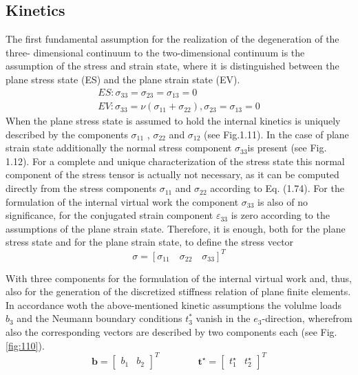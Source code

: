 \subsection{Kinetics}
The first fundamental assumption for the realization of the degeneration of the three- dimensional continuum to the two-dimensional continuum is the assumption of the stress and strain
state, where it is distinguished between the plane stress state (ES) and the plane strain state
(EV).
\begin{equation}
\label{eqn:3.2}
    \begin{gathered}
ES:{\sigma _{33}} = {\sigma _{23}} = {\sigma _{13}} = 0\\
EV:{\sigma _{33}} = \nu \left( {{\sigma _{11}} + {\sigma _{22}}} \right),{\sigma _{23}} = {\sigma _{13}} = 0
\end{gathered}
\end{equation}
When the plane stress state is assumed to hold the internal kinetics is uniquely described by
the components $\sigma_{11}$ , $\sigma_{22}$ and $\sigma_{12}$ (see Fig.1.11). In the case of plane strain state additionally
the normal stress component $\sigma_{33}$is present (see Fig. 1.12). For a complete and unique
characterization of the stress state this normal component of the stress tensor is actually not
necessary, as it can be computed directly from the stress components $\sigma_{11}$ and $\sigma_{22}$ according to
Eq. (1.74). For the formulation of the internal virtual work the component $\sigma_{33}$ is also of no
significance, for the conjugated strain component $\varepsilon_{33}$ is zero according to the assumptions of
the plane strain state. Therefore, it is enough, both for the plane stress state and for the plane
strain state, to define the stress vector
\begin{equation}
\label{eqn:3.3}
    \sigma=[\sigma_{11} \quad \sigma_{22} \quad \sigma_{33}]^T
\end{equation}

With three components for the formulation of the internal virtual work and, thus, also for the
generation of the discretized stiffness relation of plane finite elements. In accordance woth
the above-mentioned kinetic assumptions the volulme loads $b_3$ and the Neumann boundary
conditions $t^{*}_3$ vanish in the $e_3$-direction, wherefrom also the corresponding vectors are described
by two components each (see Fig. \ref{fig:110}).
\begin{equation}
\label{eqn:3.4}
 \boldsymbol{b}=\left[\begin{array}{ll}b_{1} & b_{2}\end{array}\right]^{T} \qquad \qquad \boldsymbol{t}^{\star}=\left[\begin{array}{ll}t_{1}^{\star} & t_{2}^{\star}\end{array}\right]^{T} 
\end{equation}

